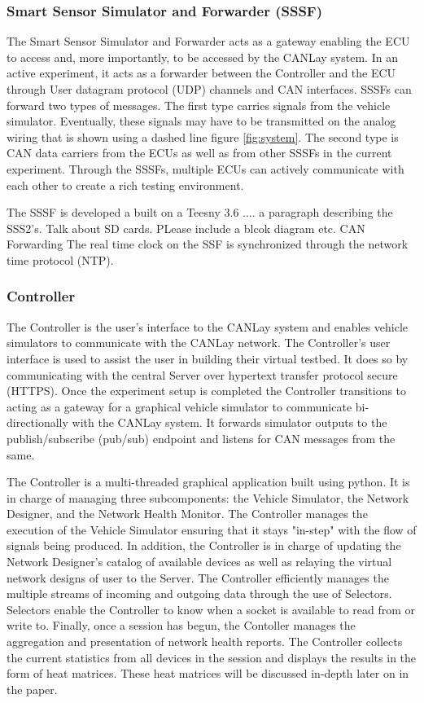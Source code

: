 \documentclass[letterpaper,twocolumn,12pt]{article}
\begin{document}
\subsubsection{Smart Sensor Simulator and Forwarder (SSSF)}
The Smart Sensor Simulator and Forwarder acts as a gateway enabling the ECU to access and, more importantly, to be accessed by the CANLay system. In an active experiment, it acts as a forwarder between the Controller and the ECU through User datagram protocol (UDP) channels and CAN interfaces. SSSFs can forward two types of messages. 
The first type carries signals from the vehicle simulator. Eventually, these signals may have to be transmitted on the analog wiring that is shown using a dashed line figure \ref{fig:system}.  
The second type is CAN data carriers from the ECUs as well as from other SSSFs in the current experiment. Through the SSSFs, multiple ECUs can actively communicate with each other to create a rich testing environment.

The SSSF is developed a built on a Teesny 3.6 .... a paragraph describing the SSS2's. Talk about SD cards. PLease include a blcok diagram etc.
CAN Forwarding 
The real time clock on the SSF is synchronized through the network time protocol (NTP).

\subsubsection{Controller}
The Controller is the user's interface to the CANLay system and enables vehicle simulators to communicate with the CANLay network. The Controller’s user interface is used to assist the user in building their virtual testbed. 
It does so by communicating with the central Server over hypertext transfer protocol secure (HTTPS). 
Once the experiment setup is completed the Controller transitions to acting as a gateway for a graphical vehicle simulator to communicate bi-directionally with the CANLay system. It forwards simulator outputs to the publish/subscribe (pub/sub) endpoint and listens for CAN messages from the same.

The Controller is a multi-threaded graphical application built using python. It is in charge of managing three subcomponents: the Vehicle Simulator, the Network Designer, and the Network Health Monitor. The Controller manages the execution of the Vehicle Simulator ensuring that it stays "in-step" with the flow of signals being produced. In addition, the Controller is in charge of updating the Network Designer's catalog of available devices as well as relaying the virtual network designs of user to the Server. The Controller efficiently manages the multiple streams of incoming and outgoing data through the use of Selectors. Selectors enable the Controller to know when a socket is available to read from or write to. Finally, once a session has begun, the Contoller manages the aggregation and presentation of network health reports. The Controller collects the current statistics from all devices in the session and displays the results in the form of heat matrices. These heat matrices will be discussed in-depth later on in the paper.
\end{document}
